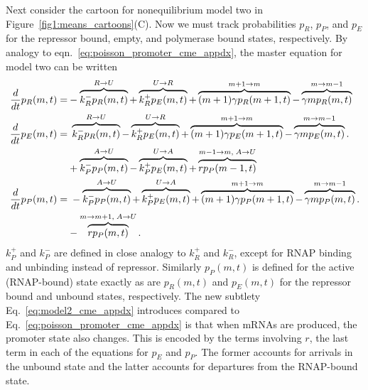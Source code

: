Next consider the cartoon for nonequilibrium model two in
Figure~\ref{fig1:means_cartoons}(C). Now we must track probabilities $p_R$,
$p_P$, and $p_E$ for the repressor bound, empty, and polymerase bound states,
respectively. By analogy to eqn.~\ref{eq:poisson_promoter_cme_appdx}, the master
equation for model two can be written
\begin{align}
\begin{split}
\frac{d {}}{d t}p_R(m,t) =& 
- \overbrace{k_R^- p_R(m,t)}^{R \rightarrow U}
+ \overbrace{k_R^+ p_E(m,t)}^{U \rightarrow R}
+ \overbrace{(m+1)\gamma p_R(m+1,t)}^{m + 1 \rightarrow m}
- \overbrace{\gamma mp_R(m,t)}^{m \rightarrow m - 1}
\\
\frac{d {}}{d t}p_E(m,t) =&\; 
  \overbrace{k_R^- p_R(m,t)}^{R \rightarrow U}
- \overbrace{k_R^+ p_E(m,t)}^{U \rightarrow R}
+ \overbrace{(m+1)\gamma p_E(m+1,t)}^{m + 1 \rightarrow m}
- \overbrace{\gamma mp_E(m,t)}^{m \rightarrow m - 1}.
\\
&
+ \overbrace{k_P^- p_P(m,t)}^{A \rightarrow U}
- \overbrace{k_P^+ p_E(m,t)}^{U \rightarrow A}
+ \overbrace{rp_P(m-1,t)}^{m-1 \rightarrow m,\;A \rightarrow U}
\\
\frac{d {}}{d t}p_P(m,t) =&\; 
- \overbrace{k_P^- p_P(m,t)}^{A \rightarrow U}
+ \overbrace{k_P^+ p_E(m,t)}^{U \rightarrow A}
+ \overbrace{(m+1)\gamma p_P(m+1,t)}^{m + 1 \rightarrow m}
- \overbrace{\gamma mp_P(m,t)}^{m \rightarrow m - 1}.
\\
&- \overbrace{rp_P(m,t)}^{m \rightarrow m + 1,\;A \rightarrow U}.
\label{eq:model2_cme_appdx}
\end{split}
\end{align}
$k_P^+$ and $k_P^-$ are defined in close analogy to $k_R^+$ and $k_R^-$, except
for RNAP binding and unbinding instead of repressor. Similarly $p_P(m,t)$ is
defined for the active (RNAP-bound) state exactly as are $p_R(m,t)$ and
$p_E(m,t)$ for the repressor bound and unbound states, respectively. The new
subtlety Eq.~\ref{eq:model2_cme_appdx} introduces compared to
Eq.~\ref{eq:poisson_promoter_cme_appdx} is that when mRNAs are produced, the
promoter state also changes. This is encoded by the terms involving $r$, the
last term in each of the equations for $p_E$ and $p_P$. The former accounts for
arrivals in the unbound state and the latter accounts for departures from the
RNAP-bound state.


